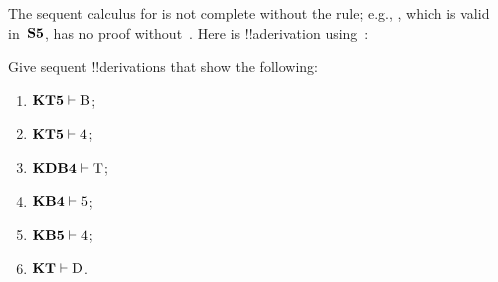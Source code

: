 \documentclass[../../../include/open-logic-section]{subfiles}
\begin{document}
\begin{ex}
The sequent calculus for  is not complete without the \Cut{}
rule; e.g., , which is valid in~$\Log{S5}$, has no proof
without~\Cut. Here is !!a{derivation} using~\Cut:
\begin{prooftree}
\end{prooftree}
\end{ex}

\begin{prob}
Give sequent !!{derivation}s that show the following:
  \begin{enumerate}
  \item $\Log{KT5} \Proves \Ax{B}$;
  \item $\Log{KT5} \Proves \Ax{4}$;
  \item $\Log{KDB4} \Proves \Ax{T}$;
  \item $\Log{KB4} \Proves \Ax{5}$;
  \item $\Log{KB5} \Proves \Ax{4}$;
  \item $\Log{KT} \Proves \Ax{D}$.
  \end{enumerate}
\end{prob}
\end{document}

